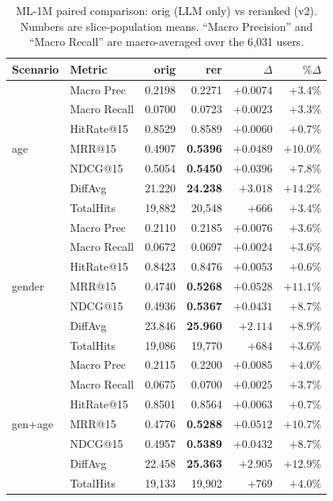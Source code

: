 \begin{table}[h]
\caption{ML-1M paired comparison: orig (LLM only) vs reranked (v2). Numbers are slice-population means. ``Macro Precision'' and ``Macro Recall'' are macro-averaged over the 6,031 users.}
\label{tab:ml1m-main}
\begin{tabular}{llrrrr}
\toprule
Scenario & Metric & orig & rer & $\Delta$ & $\%\Delta$ \\
\midrule
\multirow{7}{*}{age}
& Macro Prec & 0.2198 & 0.2271 & $+0.0074$ & $+3.4\%$ \\
& Macro Recall & 0.0700 & 0.0723 & $+0.0023$ & $+3.3\%$ \\
& HitRate@15 & 0.8529 & 0.8589 & $+0.0060$ & $+0.7\%$ \\
& MRR@15 & 0.4907 & \textbf{0.5396} & $+0.0489$ & $\mathbf{+10.0\%}$ \\
& NDCG@15 & 0.5054 & \textbf{0.5450} & $+0.0396$ & $\mathbf{+7.8\%}$ \\
& DiffAvg & 21.220 & \textbf{24.238} & $+3.018$ & $\mathbf{+14.2\%}$ \\
& TotalHits & 19{,}882 & 20{,}548 & $+666$ & $+3.4\%$ \\
\midrule
\multirow{7}{*}{gender}
& Macro Prec & 0.2110 & 0.2185 & $+0.0076$ & $+3.6\%$ \\
& Macro Recall & 0.0672 & 0.0697 & $+0.0024$ & $+3.6\%$ \\
& HitRate@15 & 0.8423 & 0.8476 & $+0.0053$ & $+0.6\%$ \\
& MRR@15 & 0.4740 & \textbf{0.5268} & $+0.0528$ & $\mathbf{+11.1\%}$ \\
& NDCG@15 & 0.4936 & \textbf{0.5367} & $+0.0431$ & $\mathbf{+8.7\%}$ \\
& DiffAvg & 23.846 & \textbf{25.960} & $+2.114$ & $\mathbf{+8.9\%}$ \\
& TotalHits & 19{,}086 & 19{,}770 & $+684$ & $+3.6\%$ \\
\midrule
\multirow{7}{*}{gen+age}
& Macro Prec & 0.2115 & 0.2200 & $+0.0085$ & $+4.0\%$ \\
& Macro Recall & 0.0675 & 0.0700 & $+0.0025$ & $+3.7\%$ \\
& HitRate@15 & 0.8501 & 0.8564 & $+0.0063$ & $+0.7\%$ \\
& MRR@15 & 0.4776 & \textbf{0.5288} & $+0.0512$ & $\mathbf{+10.7\%}$ \\
& NDCG@15 & 0.4957 & \textbf{0.5389} & $+0.0432$ & $\mathbf{+8.7\%}$ \\
& DiffAvg & 22.458 & \textbf{25.363} & $+2.905$ & $\mathbf{+12.9\%}$ \\
& TotalHits & 19{,}133 & 19{,}902 & $+769$ & $+4.0\%$ \\
\bottomrule
\end{tabular}
\end{table}

